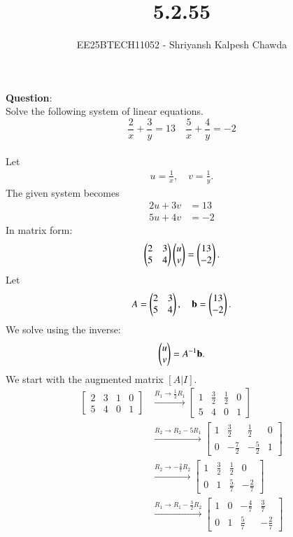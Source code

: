 \documentclass[journal]{IEEEtran}
\title{5.2.55}
\author{EE25BTECH11052 - Shriyansh Kalpesh Chawda}
\begin{document}
	\maketitle
	\textbf{Question}:\\
	Solve the following system of linear equations.\[
	\frac{2}{x} + \frac{3}{y} = 13 \quad \frac{5}{x} + \frac{4}{y} = -2 \]
	\solution\\
	Let 
	\begin{align}
		u = \frac{1}{x}, \quad v = \frac{1}{y}.
	\end{align}
	The given system becomes
	\begin{align}
		2u + 3v &= 13 \\
		5u + 4v &= -2
	\end{align}
	In matrix form:
	\begin{align}
		\begin{pmatrix}2 & 3 \\ 5 & 4\end{pmatrix} \begin{pmatrix}u \\ v\end{pmatrix} = \begin{pmatrix}13 \\ -2\end{pmatrix}.
	\end{align}
	Let 
	\begin{align}
		A = \begin{pmatrix}2 & 3 \\ 5 & 4\end{pmatrix}, \quad \mathbf{b} = \begin{pmatrix}13 \\ -2\end{pmatrix}.
	\end{align}
	We solve using the inverse:
	\begin{align}
		\begin{pmatrix}u \\ v\end{pmatrix} = A^{-1}\mathbf{b}.
	\end{align}
We start with the augmented matrix $[A|I]$.
\begin{align}
	\left[\begin{array}{cc|cc}
		2 & 3 & 1 & 0 \\
		5 & 4 & 0 & 1
	\end{array}\right]
	&\xrightarrow{R_1 \rightarrow \frac{1}{2}R_1}
	\left[\begin{array}{cc|cc}
		1 & \frac{3}{2} & \frac{1}{2} & 0 \\
		5 & 4 & 0 & 1
	\end{array}\right] \\
	&\xrightarrow{R_2 \rightarrow R_2 - 5R_1}
	\left[\begin{array}{cc|cc}
		1 & \frac{3}{2} & \frac{1}{2} & 0 \\
		0 & -\frac{7}{2} & -\frac{5}{2} & 1
	\end{array}\right] \\
	&\xrightarrow{R_2 \rightarrow -\frac{2}{7}R_2}
	\left[\begin{array}{cc|cc}
		1 & \frac{3}{2} & \frac{1}{2} & 0 \\
		0 & 1 & \frac{5}{7} & -\frac{2}{7}
	\end{array}\right] \\
	&\xrightarrow{R_1 \rightarrow R_1 - \frac{3}{2}R_2}
	\left[\begin{array}{cc|cc}
		1 & 0 & -\frac{4}{7} & \frac{3}{7} \\
		0 & 1 & \frac{5}{7} & -\frac{2}{7}
	\end{array}\right]
\end{align}
\end{document}
